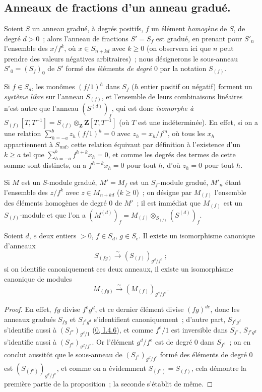 \subsection{Anneaux de fractions d'un anneau gradué.}
\label{subsection:II.2.2-fr}

\begin{env}[2.2.1]
\label{II.2.2.1-fr}
Soient $S$ un anneau gradué, à degrés positifs, $f$ un élément
\emph{homogène} de $S$, de degré $d>0$~; alors l'anneau de fractions
$S'=S_f$ est gradué, en prenant pour $S'_n$ l'ensemble des $x/f^k$, où
$x\in S_{n+kd}$ avec $k\geq 0$ (on observera ici que $n$ peut prendre des
valeurs négatives arbitraires)~; nous désignerons le sous-anneau
$S'_0=(S_f)_0$ de $S'$ formé des éléments \emph{de degré $0$} par la
notation $S_{(f)}$.

Si $f\in S_d$, les monômes $(f/1)^h$ dans $S_f$ ($h$ entier positif ou
négatif) forment un \emph{système libre} sur l'anneau $S_{(f)}$, et
l'ensemble de leurs combinaisons linéaires n'est autre que
l'anneau $(S^{(d)})_f$, qui est donc \emph{isomorphe à
$S_{(f)}[T,T^{-1}]=S_{(f)}\otimes_{\mathbf{Z}}\mathbf{Z}[T,T^{-1}]$}
(où $T$ est une indéterminée). En effet, si on a une relation
$\sum_{h=-a}^{b}z_h(f/1)^h=0$ avec $z_h=x_h/f^m$, où tous les $x_h$
appartiennent à $S_{md}$, cette relation équivaut par définition à
l'existence d'un $k\geq a$ tel que
$\sum_{h=-a}^{b}f^{h+k}x_h=0$, et comme les degrés des termes de cette somme
sont distincts, on a $f^{h+k}x_h=0$ pour tout $h$, d'où $z_h=0$ pour tout
$h$.

Si $M$ est un $S$-module gradué, $M'=M_f$ est un $S_f$-module gradué,
$M'_n$ étant l'ensemble des $z/f^k$ avec $z\in M_{n+kd}$ ($k\geq 0$)~; on
désigne par $M_{(f)}$ l'ensemble des éléments homogènes de degré $0$ de
$M'$~; il est immédiat que $M_{(f)}$ est un $S_{(f)}$-module et que l'on a
$(M^{(d)})_f=M_{(f)}\otimes_{S_{(f)}}(S^{(d)})_f$.
\end{env}

\begin{lemma}[2.2.2]
\label{II.2.2.2-fr}
Soient $d$, $e$ deux entiers $>0$, $f\in S_d$, $g\in S_e$. Il existe un
isomorphisme canonique d'anneaux
\[
  S_{(fg)}\xrightarrow{\sim}(S_{(f)})_{g^d/f^e}~;
\]
si on identifie canoniquement ces deux anneaux, il existe un isomorphisme
canonique de modules
\[
  M_{(fg)}\xrightarrow{\sim}(M_{(f)})_{g^d/f^e}.
\]
\end{lemma}

\begin{proof}
En effet, $fg$ divise $f^e g^d$, et ce dernier élément divise $(fg)^{de}$,
donc les anneaux gradués $S_{fg}$ et $S_{f^e g^d}$ s'identifient
canoniquement~; d'autre part, $S_{f^e g^d}$ s'identifie aussi à
$(S_{f^e})_{g^d/1}$ (\hyperref[0.1.4.6-fr]{0, I.4.6}), et comme $f^e/1$ est
inversible dans $S_{f^e}$, $S_{f^e g^d}$ s'identifie aussi à
$(S_{f^e})_{g^d/f^e}$. Or l'élément $g^d/f^e$ est de degré $0$ dans
$S_{f^e}$~; on en conclut aussitôt que le sous-anneau de
$(S_{f^e})_{g^d/f^e}$ formé des éléments de degré $0$ est
$(S_{(f^e)})_{g^d/f^e}$, et comme on a évidemment
$S_{(f^e)}=S_{(f)}$, cela démontre la première partie de la proposition~;
la seconde s'établit de même.
\end{proof}

